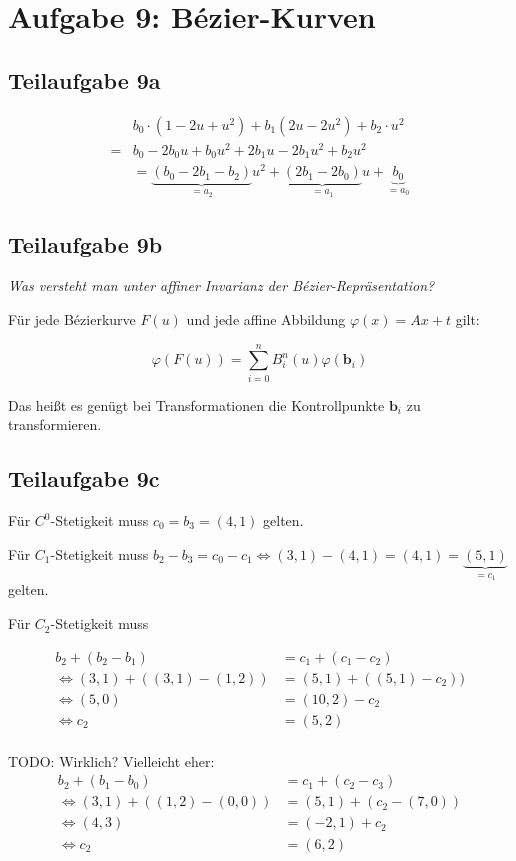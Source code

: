 \documentclass[a4paper]{scrartcl}
\begin{document}
\section*{Aufgabe 9: Bézier-Kurven}
\subsection*{Teilaufgabe 9a}

\begin{align}
     & b_0 \cdot (1-2u + u^2) + b_1 (2u - 2u^2) + b_2 \cdot u^2\\
    =& b_0 - 2 b_0 u + b_0 u^2 + 2 b_1 u - 2 b_1 u^2 + b_2 u^2\\
    &= \underbrace{(b_0 - 2 b_1 - b_2)}_{= a_2} u^2  + \underbrace{(2 b_1 - 2 b_0)}_{= a_1} u + \underbrace{b_0}_{= a_0}
\end{align}

\subsection*{Teilaufgabe 9b}
\textit{Was versteht man unter affiner Invarianz der Bézier-Repräsentation?}

Für jede Bézierkurve $F(u)$ und jede affine Abbildung $\varphi(x) = A x + t$ gilt:

\[\varphi(F(u)) = \sum_{i=0}^n B_i^n(u) \varphi(\mathbf{b}_i)\]

Das heißt es genügt bei Transformationen die Kontrollpunkte $\mathbf{b}_i$
zu transformieren.

\subsection*{Teilaufgabe 9c}
Für $C^0$-Stetigkeit muss $c_0 = b_3 = (4, 1)$ gelten.

Für $C_1$-Stetigkeit muss $b_2 - b_3 = c_0 - c_1 \Leftrightarrow (3,1) - (4,1) = (4,1) = \underbrace{(5,1)}_{= c_1}$ gelten.

Für $C_2$-Stetigkeit muss

\begin{align}
    b_2 + (b_2 - b_1) &= c_1 + (c_1 - c_2)\\
    \Leftrightarrow (3,1) + ((3,1) - (1,2)) &= (5,1) + ((5,1) - c_2))\\
    \Leftrightarrow (5, 0) &= (10, 2) - c_2\\
    \Leftrightarrow c_2 &= (5, 2)\\
\end{align}

TODO: Wirklich? Vielleicht eher:
\begin{align}
    b_2 + (b_1 - b_0) &= c_1 + (c_2 - c_3)\\
    \Leftrightarrow (3,1) + ((1,2) - (0,0)) &= (5,1) + (c_2 - (7,0))\\
    \Leftrightarrow (4, 3) &= (-2, 1) + c_2\\
    \Leftrightarrow c_2 &= (6, 2)\\
\end{align}
\end{document}
